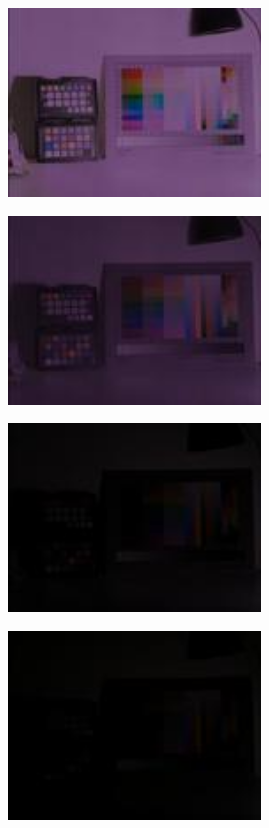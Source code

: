 {\begin{center}
\includegraphics[height=5cm]{images/100ms-1ms-40-tiny}
\end{center}

\begin{center}
\includegraphics[height=5cm]{images/100ms-1ms-48-tiny}
\end{center}

\begin{center}
\includegraphics[height=5cm]{images/100ms-1ms-56-tiny}
\end{center}

\begin{center}
\includegraphics[height=5cm]{images/100ms-1ms-63-tiny}
\end{center}

}
